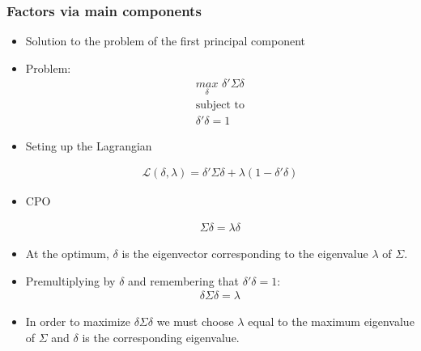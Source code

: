 \documentclass[
  shownotes,
  xcolor={svgnames},
  hyperref={colorlinks,citecolor=DarkBlue,linkcolor=DarkRed,urlcolor=DarkBlue}
  , aspectratio=169]{beamer}
\begin{document}
\begin{frame}
\frametitle{Factors via main components}

\begin{itemize}


\item Solution to the problem of the first principal component
\item Problem: 
\begin{align}
\underset{\delta}{max}\,\, \delta' \Sigma \delta \\ \nonumber
\text{subject to}  \\ \nonumber
\delta' \delta = 1 \nonumber
\end{align}
\item Seting up the Lagrangian

\begin{align}
\mathcal{L}(\delta,\lambda) = \delta' \Sigma \delta + \lambda(1-\delta'\delta)
\end{align}
\item CPO

\begin{align}
\Sigma \delta = \lambda \delta
\end{align}

\item At the optimum, $\delta$ is the eigenvector corresponding to the eigenvalue $\lambda$ of $\Sigma$. 
\item Premultiplying by $\delta$ and  remembering that $\delta'\delta = 1$:
\begin{align}
\delta \Sigma \delta = \lambda
\end{align}

\item In order to maximize $\delta \Sigma \delta $ we must choose $\lambda$ equal to the maximum eigenvalue of $\Sigma$ and $\delta$ is the corresponding eigenvalue.
\end{itemize}
\end{frame}
\end{document}
